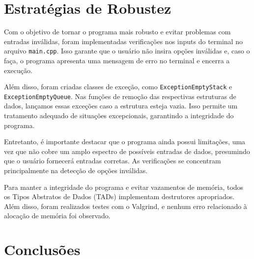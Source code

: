 \documentclass{article}
\begin{document}
\section{Estratégias de Robustez}
Com o objetivo de tornar o programa mais robusto e evitar problemas com entradas inválidas, foram implementadas verificações nos inputs do terminal no arquivo \texttt{main.cpp}. Isso garante que o usuário não insira opções inválidas e, caso o faça, o programa apresenta uma mensagem de erro no terminal e encerra a execução.

Além disso, foram criadas classes de exceção, como \texttt{ExceptionEmptyStack} e \texttt{ExceptionEmptyQueue}. Nas funções de remoção das respectivas estruturas de dados, lançamos essas exceções caso a estrutura esteja vazia. Isso permite um tratamento adequado de situações excepcionais, garantindo a integridade do programa.

Entretanto, é importante destacar que o programa ainda possui limitações, uma vez que não cobre um amplo espectro de possíveis entradas de dados, presumindo que o usuário fornecerá entradas corretas. As verificações se concentram principalmente na detecção de opções inválidas.

Para manter a integridade do programa e evitar vazamentos de memória, todos os Tipos Abstratos de Dados (TADs) implementam destrutores apropriados. Além disso, foram realizados testes com o Valgrind, e nenhum erro relacionado à alocação de memória foi observado.

\section{Conclusões}
\end{document}
